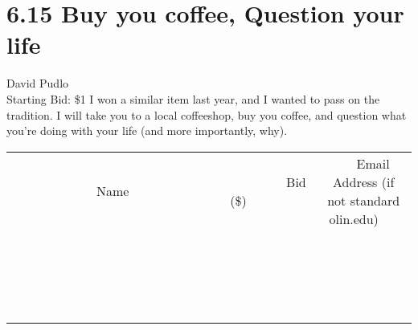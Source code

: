 \documentclass[11pt]{article}
\begin{document}
\section*{6.15 Buy you coffee, Question your life}
David Pudlo
\\
Starting Bid: \$1
\newline
I won a similar item last year, and I wanted to pass on the tradition. I will take you to a local coffeeshop, buy you coffee, and question what you're doing with your life (and more importantly, why).
\\[3ex]
\begin{tabular}{c c c}
~~~~~~~~~~~~~Name~~~~~~~~~~~~~ & ~~~~~~~~~Bid (\$)~~~~~~~~~  & ~~~Email Address (if not standard olin.edu)~~~\\
 & & \\
\hline
 & & \\
\hline
 & & \\
\hline
 & & \\
\hline
 & & \\
\hline
 & & \\
\hline
 & & \\
\hline
 & & \\
\hline
 & & \\
\hline
 & & \\
\hline
 & & \\
\hline
 & & \\
\hline
 & & \\
\hline
 & & \\
\hline
 & & \\
\hline
 & & \\
\hline
 & & \\
\hline
 & & \\
\hline
 & & \\
\hline
\end{tabular}
\newpage
\end{document}
